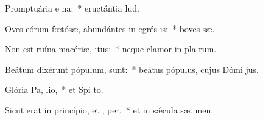 \item Promptuária e na:~* eructántia    lud.
\item Oves eórum fœtósæ, abundántes in egrés is:~* boves  sæ.
\item Non est ruína macériæ,  itus:~* neque clamor in pla rum.
\item Beátum dixérunt pópulum,   sunt:~* beátus pópulus, cujus Dómi  jus.
\item Glória Pa,  lio,~* et Spi to.
\item Sicut erat in princípio, et ,  per,~* et in sǽcula sæ. men.
